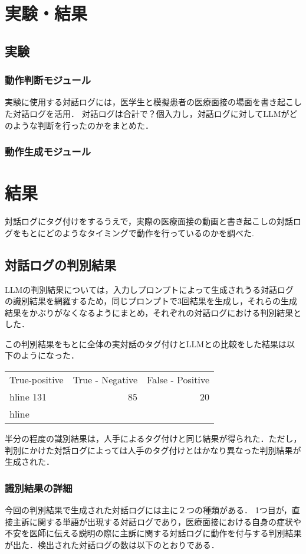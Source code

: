 \section{実験・結果}\label{result}

\subsection{実験}
\subsubsection*{動作判断モジュール}
実験に使用する対話ログには，医学生と模擬患者の医療面接の場面を書き起こした対話ログを活用．
対話ログは合計で？個入力し，対話ログに対してLLMがどのような判断を行ったのかをまとめた．

\subsubsection*{動作生成モジュール}

\section{結果}
対話ログにタグ付けをするうえで，実際の医療面接の動画と書き起こしの対話ログをもとにどのようなタイミングで動作を行っているのかを調べた.

\subsection{対話ログの判別結果}
LLMの判別結果については，入力しプロンプトによって生成されうる対話ログの識別結果を網羅するため，同じプロンプトで3回結果を生成し，それらの生成結果をかぶりがなくなるようにまとめ，それぞれの対話ログにおける判別結果とした．

この判別結果をもとに全体の実対話のタグ付けとLLMとの比較をした結果は以下のようになった．
\begin{tabular}{|l|r|r|} \hline
True-positive & True - Negative & False - Positive \\hline
131 & 85 & 20 \\hline
\end {tabular}

半分の程度の識別結果は，人手によるタグ付けと同じ結果が得られた．ただし，判別にかけた対話ログによっては人手のタグ付けとはかなり異なった判別結果が生成された．

\subsubsection {識別結果の詳細}
今回の判別結果で生成された対話ログには主に２つの種類がある．
1つ目が，直接主訴に関する単語が出現する対話ログであり，医療面接における自身の症状や不安を医師に伝える説明の際に主訴に関する対話ログに動作を付与する判別結果が出た．検出された対話ログの数は以下のとおりである．


